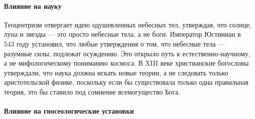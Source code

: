 \paragraph{Влияние на науку}

Теоцентризм отвергает идею одушевленных небесных тел, утверждая, что солнце, луна и звезды — это просто небесные тела, а не боги. Император Юстиниан в 543 году установил, что любые утверждения о том, что небесные тела — разумные силы, подлежат осуждению. Это открыло путь к естественно-научному, а не мифологическому пониманию космоса. В XIII веке христианские богословы утверждали, что наука должна искать новые теории, а не следовать только аристотельской физике, поскольку если бы существовала только одна правильная теория, это бы ставило под сомнение всемогущество Бога.

\paragraph{Влияние на гносеологические установки} 


